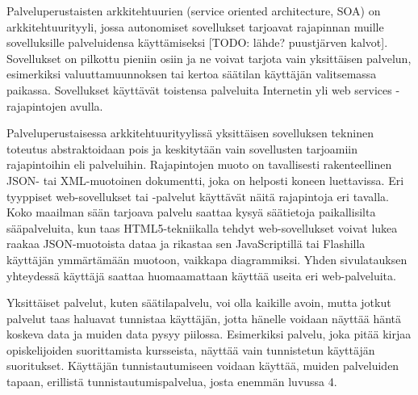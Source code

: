 Palveluperustaisten arkkitehtuurien (service oriented architecture, SOA) on arkkitehtuurityyli, jossa autonomiset sovellukset tarjoavat rajapinnan muille sovelluksille palveluidensa käyttämiseksi [TODO: lähde? puustjärven kalvot]. Sovellukset on pilkottu pieniin osiin ja ne voivat tarjota vain yksittäisen palvelun, esimerkiksi valuuttamuunnoksen tai kertoa säätilan käyttäjän valitsemassa paikassa. Sovellukset käyttävät toistensa palveluita Internetin yli web services -rajapintojen avulla.

Palveluperustaisessa arkkitehtuurityylissä yksittäisen sovelluksen tekninen toteutus abstraktoidaan pois ja keskitytään vain sovellusten tarjoamiin rajapintoihin eli palveluihin. Rajapintojen muoto on tavallisesti rakenteellinen JSON- tai XML-muotoinen dokumentti, joka on helposti koneen luettavissa. Eri tyyppiset web-sovellukset tai -palvelut käyttävät näitä rajapintoja eri tavalla. Koko maailman sään tarjoava palvelu saattaa kysyä säätietoja paikallisilta sääpalveluita, kun taas HTML5-tekniikalla tehdyt web-sovellukset voivat lukea raakaa JSON-muotoista dataa ja rikastaa sen JavaScriptillä tai Flashilla käyttäjän ymmärtämään muotoon, vaikkapa diagrammiksi. Yhden sivulatauksen yhteydessä käyttäjä saattaa huomaamattaan käyttää useita eri web-palveluita.

Yksittäiset palvelut, kuten säätilapalvelu, voi olla kaikille avoin, mutta jotkut palvelut taas haluavat tunnistaa käyttäjän, jotta hänelle voidaan näyttää häntä koskeva data ja muiden data pysyy piilossa. Esimerkiksi palvelu, joka pitää kirjaa opiskelijoiden suorittamista kursseista, näyttää vain tunnistetun käyttäjän suoritukset. Käyttäjän tunnistautumiseen voidaan käyttää, muiden palveluiden tapaan, erillistä tunnistautumispalvelua, josta enemmän luvussa 4.